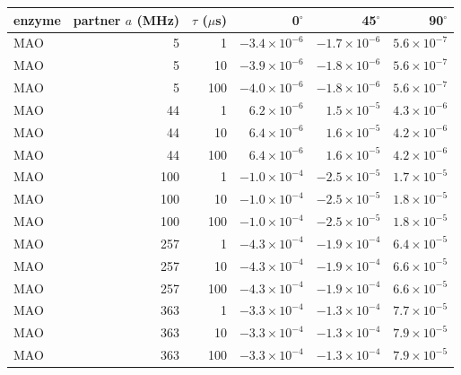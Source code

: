 \begin{tabular}{lrrrrr}
\toprule
enzyme & partner $a$ (MHz) & $\tau$ ($\mu$s) & 0$^\circ$ & 45$^\circ$ & 90$^\circ$ \\
\midrule
MAO & 5 & 1 & $\ensuremath{-3.4\times10^{-6}}$ & $\ensuremath{-1.7\times10^{-6}}$ & $\ensuremath{5.6\times10^{-7}}$ \\
MAO & 5 & 10 & $\ensuremath{-3.9\times10^{-6}}$ & $\ensuremath{-1.8\times10^{-6}}$ & $\ensuremath{5.6\times10^{-7}}$ \\
MAO & 5 & 100 & $\ensuremath{-4.0\times10^{-6}}$ & $\ensuremath{-1.8\times10^{-6}}$ & $\ensuremath{5.6\times10^{-7}}$ \\
MAO & 44 & 1 & $\ensuremath{6.2\times10^{-6}}$ & $\ensuremath{1.5\times10^{-5}}$ & $\ensuremath{4.3\times10^{-6}}$ \\
MAO & 44 & 10 & $\ensuremath{6.4\times10^{-6}}$ & $\ensuremath{1.6\times10^{-5}}$ & $\ensuremath{4.2\times10^{-6}}$ \\
MAO & 44 & 100 & $\ensuremath{6.4\times10^{-6}}$ & $\ensuremath{1.6\times10^{-5}}$ & $\ensuremath{4.2\times10^{-6}}$ \\
MAO & 100 & 1 & $\ensuremath{-1.0\times10^{-4}}$ & $\ensuremath{-2.5\times10^{-5}}$ & $\ensuremath{1.7\times10^{-5}}$ \\
MAO & 100 & 10 & $\ensuremath{-1.0\times10^{-4}}$ & $\ensuremath{-2.5\times10^{-5}}$ & $\ensuremath{1.8\times10^{-5}}$ \\
MAO & 100 & 100 & $\ensuremath{-1.0\times10^{-4}}$ & $\ensuremath{-2.5\times10^{-5}}$ & $\ensuremath{1.8\times10^{-5}}$ \\
MAO & 257 & 1 & $\ensuremath{-4.3\times10^{-4}}$ & $\ensuremath{-1.9\times10^{-4}}$ & $\ensuremath{6.4\times10^{-5}}$ \\
MAO & 257 & 10 & $\ensuremath{-4.3\times10^{-4}}$ & $\ensuremath{-1.9\times10^{-4}}$ & $\ensuremath{6.6\times10^{-5}}$ \\
MAO & 257 & 100 & $\ensuremath{-4.3\times10^{-4}}$ & $\ensuremath{-1.9\times10^{-4}}$ & $\ensuremath{6.6\times10^{-5}}$ \\
MAO & 363 & 1 & $\ensuremath{-3.3\times10^{-4}}$ & $\ensuremath{-1.3\times10^{-4}}$ & $\ensuremath{7.7\times10^{-5}}$ \\
MAO & 363 & 10 & $\ensuremath{-3.3\times10^{-4}}$ & $\ensuremath{-1.3\times10^{-4}}$ & $\ensuremath{7.9\times10^{-5}}$ \\
MAO & 363 & 100 & $\ensuremath{-3.3\times10^{-4}}$ & $\ensuremath{-1.3\times10^{-4}}$ & $\ensuremath{7.9\times10^{-5}}$ \\

\end{tabular}
